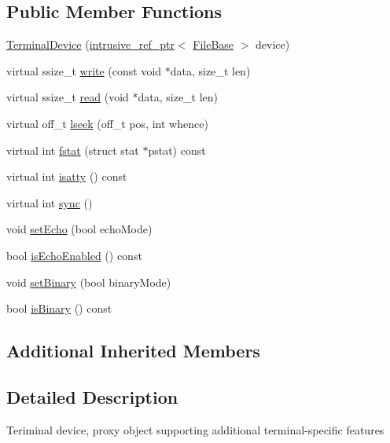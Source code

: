 \subsection*{Public Member Functions}
\begin{DoxyCompactItemize}
\item 
\hyperlink{classmiosix_1_1_terminal_device_a341ad1ca71eeeab010d337779626fd2e}{Terminal\-Device} (\hyperlink{classmiosix_1_1intrusive__ref__ptr}{intrusive\-\_\-ref\-\_\-ptr}$<$ \hyperlink{classmiosix_1_1_file_base}{File\-Base} $>$ device)
\item 
virtual ssize\-\_\-t \hyperlink{classmiosix_1_1_terminal_device_a5af5b5ec018c37b74a2dda08771b5d89}{write} (const void $\ast$data, size\-\_\-t len)
\item 
virtual ssize\-\_\-t \hyperlink{classmiosix_1_1_terminal_device_a43ccc1cf6ddbf97013aa6dca95179ee3}{read} (void $\ast$data, size\-\_\-t len)
\item 
virtual off\-\_\-t \hyperlink{classmiosix_1_1_terminal_device_afbb392a9ddacccb30bb416d46d9e4ca3}{lseek} (off\-\_\-t pos, int whence)
\item 
virtual int \hyperlink{classmiosix_1_1_terminal_device_a0de68aeb912ccc7a4c99abe641a16c06}{fstat} (struct stat $\ast$pstat) const 
\item 
virtual int \hyperlink{classmiosix_1_1_terminal_device_a1198b0926fad671a93c74bcf09689112}{isatty} () const 
\item 
virtual int \hyperlink{classmiosix_1_1_terminal_device_a9782c0195e384624f15dc25a636b5774}{sync} ()
\item 
void \hyperlink{classmiosix_1_1_terminal_device_ada45a5c2ada67fe01b49293f1a8cdf01}{set\-Echo} (bool echo\-Mode)
\item 
bool \hyperlink{classmiosix_1_1_terminal_device_a168dd3ac17071260f32f9fc1e42233da}{is\-Echo\-Enabled} () const 
\item 
void \hyperlink{classmiosix_1_1_terminal_device_abe7bee8e4558ea911ea806151c0f78e5}{set\-Binary} (bool binary\-Mode)
\item 
bool \hyperlink{classmiosix_1_1_terminal_device_aaff3d9c0aa1a4dfaf8ebfe07dd44004a}{is\-Binary} () const 
\end{DoxyCompactItemize}
\subsection*{Additional Inherited Members}


\subsection{Detailed Description}
Teriminal device, proxy object supporting additional terminal-\/specific features 

